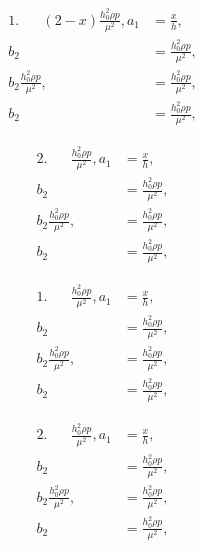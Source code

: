 		\begin{minipage}[t]{0.5\textwidth}
			\begin{align*}
			1.\hspace{20pt}(2-x)\frac{h_0^2 \rho p}{\mu^2},a_1 &= \frac{x}{h},\\ 
			b_2 &= \frac{h_0^2 \rho p}{\mu^2},\\
			b_2\frac{h_0^2 \rho p}{\mu^2}, &= \frac{h_0^2 \rho p}{\mu^2},\\
			b_2 &= \frac{h_0^2 \rho p}{\mu^2},
			\end{align*}
		\end{minipage}
		\begin{minipage}[t]{0.5\textwidth}
			\begin{align*}
			2.\hspace{20pt}\frac{h_0^2 \rho p}{\mu^2},a_1 &= \frac{x}{h},\\ 
			b_2 &= \frac{h_0^2 \rho p}{\mu^2},\\
			b_2\frac{h_0^2 \rho p}{\mu^2}, &= \frac{h_0^2 \rho p}{\mu^2},\\
			b_2 &= \frac{h_0^2 \rho p}{\mu^2},
			\end{align*}
		\end{minipage}
		
		
		\vspace{10 mm}
		
		\begin{minipage}[t]{0.5\textwidth}
			\begin{align*}
			1.\hspace{20pt}\frac{h_0^2 \rho p}{\mu^2},a_1 &= \frac{x}{h},\\ 
			b_2 &= \frac{h_0^2 \rho p}{\mu^2},\\
			b_2\frac{h_0^2 \rho p}{\mu^2}, &= \frac{h_0^2 \rho p}{\mu^2},\\
			b_2 &= \frac{h_0^2 \rho p}{\mu^2},
			\end{align*}
		\end{minipage}
		\begin{minipage}[t]{0.5\textwidth}
			\begin{align*}
			2.\hspace{20pt}\frac{h_0^2 \rho p}{\mu^2},a_1 &= \frac{x}{h},\\ 
			b_2 &= \frac{h_0^2 \rho p}{\mu^2},\\
			b_2\frac{h_0^2 \rho p}{\mu^2}, &= \frac{h_0^2 \rho p}{\mu^2},\\
			b_2 &= \frac{h_0^2 \rho p}{\mu^2},
			\end{align*}
		\end{minipage}
		
